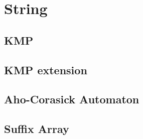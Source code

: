 \section{String}

\subsection{KMP}


\subsection{KMP extension}

\subsection{Aho-Corasick Automaton}


\subsection{Suffix Array}



